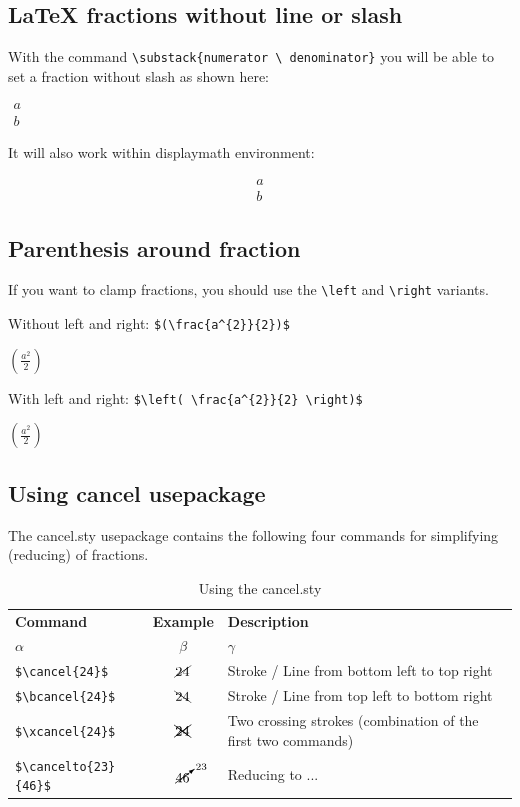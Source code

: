 \documentclass[12]{article}
\begin{document}
       \subsection{LaTeX fractions without line or slash}%
       With the command \verb|\substack{numerator \ denominator}| you will be able to set a fraction without slash as shown here:

       $\substack{a\\b}$

       It will also work within displaymath environment:

       \[\substack{a\\b}\]
        
       \subsection{Parenthesis around fraction}
       If you want to clamp fractions, you should use the \verb|\left| and \verb|\right| variants.

       Without left and right: \verb|$(\frac{a^{2}}{2})$|
        
       $(\frac{a^{2}}{2})$

       With left and right: \verb|$\left( \frac{a^{2}}{2} \right)$|

       $\left( \frac{a^{2}}{2} \right)$

       \subsection{Using cancel usepackage}
       The \textsf{cancel.sty} usepackage contains the following four commands for simplifying (reducing) of fractions.

\begin{table}[h!]
  \begin{center}
    \caption{Using the cancel.sty}
    \label{tab:cancel-table}
    \begin{tabular}{l|c|l} %
      \textbf{Command}          & \textbf{Example} & \textbf{Description}\\
      $\alpha$                      & $\beta$               & $\gamma$ \\
      \hline
      \verb|$\cancel{24}$|          & $\cancel{24}$         & Stroke / Line from bottom left to top right\\
      \verb|$\bcancel{24}$|         & $\bcancel{24}$        & Stroke / Line from top left to bottom right\\
      \verb|$\xcancel{24}$|         & $\xcancel{24}$        & Two crossing strokes (combination of the first two commands)\\
      \verb|$\cancelto{23}{46}$|    & $\cancelto{23}{46}$   & Reducing to ...\\
    \end{tabular}
  \end{center}
\end{table}
\end{document}

